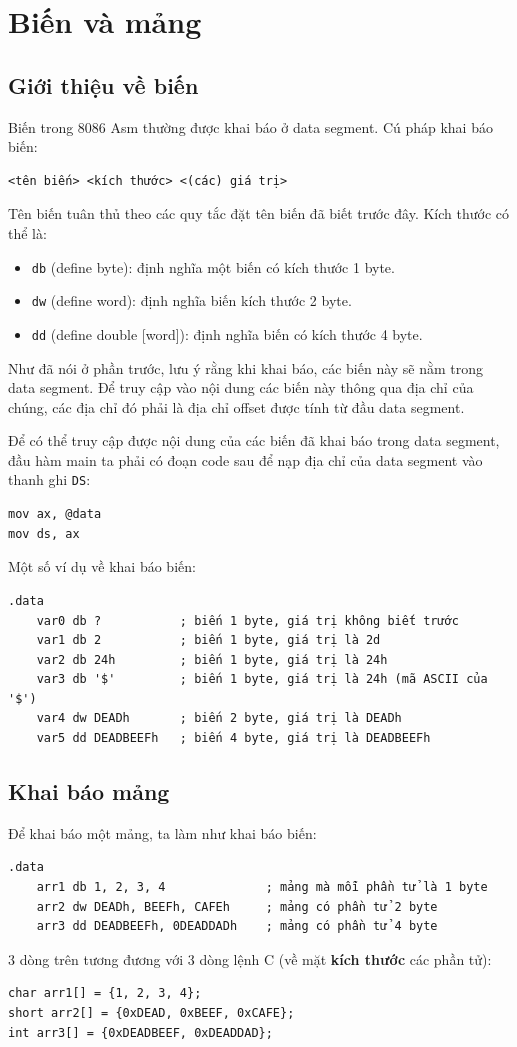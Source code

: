 \documentclass[12pt]{report}
\newcommand{\code}[1]{\texttt{#1}}
\begin{document}
\section{Biến và mảng}
\subsection{Giới thiệu về biến}
Biến trong 8086 Asm thường được khai báo ở data segment.
Cú pháp khai báo biến:
\begin{verbatim}
<tên biến> <kích thước> <(các) giá trị>
\end{verbatim}

Tên biến tuân thủ theo các quy tắc đặt tên biến đã biết trước đây.
Kích thước có thể là:
\begin{itemize}
    \item \code{db} (define byte): định nghĩa một biến có kích thước 1 byte.
    \item \code{dw} (define word): định nghĩa biến kích thước 2 byte.
    \item \code{dd} (define double [word]): định nghĩa biến có kích thước 4 byte.
\end{itemize}

Như đã nói ở phần trước, lưu ý rằng khi khai báo, các biến này sẽ nằm trong data segment. Để truy cập vào nội dung các biến này thông qua địa chỉ của chúng, các địa chỉ đó phải là địa chỉ offset được tính từ đầu data segment.

Để có thể truy cập được nội dung của các biến đã khai báo trong data segment, đầu hàm main ta phải có đoạn code sau để nạp địa chỉ của data segment vào thanh ghi \code{DS}:
\begin{verbatim}
mov ax, @data 
mov ds, ax
\end{verbatim}

Một số ví dụ về khai báo biến:
\begin{verbatim}
.data 
    var0 db ?           ; biến 1 byte, giá trị không biết trước
    var1 db 2           ; biến 1 byte, giá trị là 2d
    var2 db 24h         ; biến 1 byte, giá trị là 24h
    var3 db '$'         ; biến 1 byte, giá trị là 24h (mã ASCII của '$')
    var4 dw DEADh       ; biến 2 byte, giá trị là DEADh
    var5 dd DEADBEEFh   ; biến 4 byte, giá trị là DEADBEEFh
\end{verbatim}

\subsection{Khai báo mảng}
Để khai báo một mảng, ta làm như khai báo biến:
\begin{verbatim}
.data
    arr1 db 1, 2, 3, 4              ; mảng mà mỗi phần tử là 1 byte
    arr2 dw DEADh, BEEFh, CAFEh     ; mảng có phần tử 2 byte
    arr3 dd DEADBEEFh, 0DEADDADh    ; mảng có phần tử 4 byte
\end{verbatim}
3 dòng trên tương đương với 3 dòng lệnh C (về mặt \textbf{kích thước} các phần tử):
\begin{verbatim}
char arr1[] = {1, 2, 3, 4};
short arr2[] = {0xDEAD, 0xBEEF, 0xCAFE};
int arr3[] = {0xDEADBEEF, 0xDEADDAD};
\end{verbatim}
\end{document}
